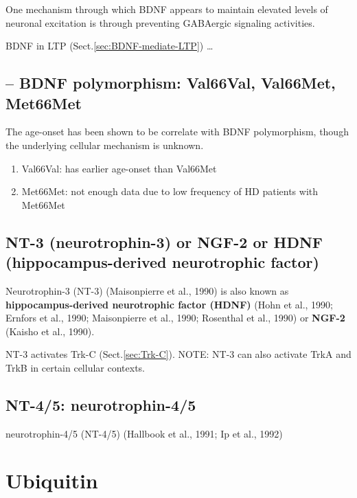 One mechanism through which BDNF appears to maintain elevated levels of neuronal
excitation is through preventing GABAergic signaling activities.

BDNF in LTP (Sect.\ref{sec:BDNF-mediate-LTP})
\ldots

\subsection{-- BDNF polymorphism: Val66Val, Val66Met, Met66Met}
\label{sec:BDNF-Val66Val}
\label{sec:BDNF-Val66Met}

The age-onset has been shown to be correlate with BDNF polymorphism, though the
underlying cellular mechanism is unknown.
\begin{enumerate}
  \item Val66Val: has earlier age-onset than Val66Met
  
  \item Met66Met: not enough data due to low frequency of HD patients with
  Met66Met
\end{enumerate}


\subsection{NT-3 (neurotrophin-3) or NGF-2 or HDNF (hippocampus-derived
neurotrophic factor)}
\label{sec:NT-3}


Neurotrophin-3 (NT-3) (Maisonpierre et al., 1990) is also known as {\bf
hippocampus-derived neurotrophic factor (HDNF)} (Hohn et al., 1990;
Ernfors et al., 1990; Maisonpierre et al., 1990; Rosenthal et al., 1990) or 
{\bf NGF-2}  (Kaisho et al., 1990).

NT-3 activates Trk-C
(Sect.\ref{sec:Trk-C}). NOTE: NT-3 can also activate TrkA and TrkB in certain
cellular contexts.

\subsection{NT-4/5: neurotrophin-4/5}
\label{sec:NT-4/5}

neurotrophin-4/5 (NT-4/5) (Hallbook et al., 1991; Ip et al., 1992) 



\section{Ubiquitin}
\label{sec:ubiquitin}

